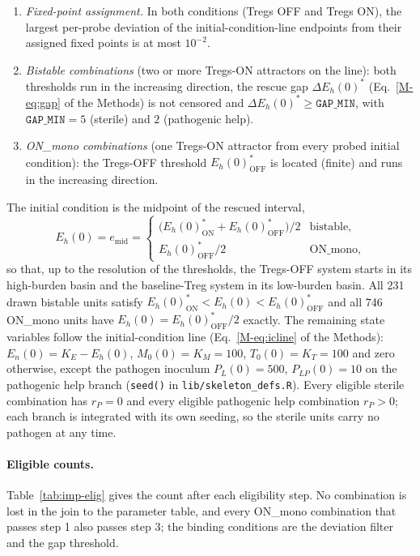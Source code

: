 \documentclass[11pt]{article}
\newcommand{\gap}{\Delta E_h(0)^{*}}
\begin{document}
\begin{enumerate}
\item \emph{Fixed-point assignment.} In both conditions (Tregs OFF and Tregs ON),
  the largest per-probe deviation of the initial-condition-line endpoints
  from their assigned fixed points is at most $10^{-2}$.
\item \emph{Bistable combinations} (two or more Tregs-ON attractors on the line):
  both thresholds run in the increasing direction, the rescue gap
  $\gap$ (Eq.~\ref{M-eq:gap} of the Methods) is not censored and
  $\gap \ge \texttt{GAP\_MIN}$, with $\texttt{GAP\_MIN} = 5$ (sterile) and
  $2$ (pathogenic help).
\item \emph{ON\_mono combinations} (one Tregs-ON attractor
  from every probed initial condition): the Tregs-OFF threshold
  $E_h(0)^*_{\mathrm{OFF}}$ is located (finite) and runs in the increasing
  direction.
\end{enumerate}
The initial condition is the midpoint of the rescued interval,
\begin{equation}
  E_h(0) = e_{\mathrm{mid}} =
  \begin{cases}
    \big(E_h(0)^*_{\mathrm{ON}} + E_h(0)^*_{\mathrm{OFF}}\big)/2 & \text{bistable},\\
    E_h(0)^*_{\mathrm{OFF}}/2 & \text{ON\_mono},
  \end{cases}
\end{equation}
so that, up to the resolution of the thresholds, the Tregs-OFF system starts in
its high-burden basin and the baseline-Treg system in its low-burden basin. All
231 drawn bistable units satisfy
$E_h(0)^*_{\mathrm{ON}} < E_h(0) < E_h(0)^*_{\mathrm{OFF}}$ and all 746 ON\_mono units
have $E_h(0) = E_h(0)^*_{\mathrm{OFF}}/2$ exactly. The remaining state
variables follow the initial-condition line (Eq.~\ref{M-eq:icline} of the Methods): $E_n(0) = K_E - E_h(0)$, $M_0(0) = K_M = 100$,
$T_0(0) = K_T = 100$ and zero otherwise, except the pathogen inoculum
$P_L(0) = 500$, $P_{LP}(0) = 10$ on the pathogenic help branch
(\texttt{seed()} in \texttt{lib/skeleton\_defs.R}). Every eligible sterile
combination has $r_P = 0$ and every eligible pathogenic help combination
$r_P > 0$; each branch is integrated with its own seeding, so the sterile units
carry no pathogen at any time.

\paragraph{Eligible counts.}
Table~\ref{tab:imp-elig} gives the count after each eligibility step. No combination is lost in the join to the parameter table, and every
ON\_mono combination that passes step 1 also passes step 3; the binding
conditions are the deviation filter and the gap threshold.
\end{document}
